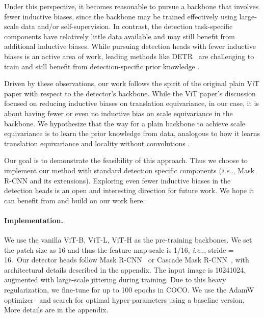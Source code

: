 \documentclass[runningheads]{llncs}
\makeatletter
\DeclareRobustCommand\onedot{\futurelet\@let@token\@onedot}
\def\@onedot{\ifx\@let@token.\else.\null\fi\xspace}
\def\ie{\emph{i.e}\onedot} \def\Ie{\emph{I.e}\onedot}
\makeatother
\begin{document}
Under this perspective, it becomes reasonable to pursue a backbone that involves fewer inductive biases, since the backbone may be trained effectively using large-scale data and/or self-supervision. In contrast, the detection task-specific components have relatively little data available and may still benefit from additional inductive biases. While pursuing detection heads with fewer inductive biases is an active area of work, leading methods like DETR~\cite{Carion2020} are challenging to train and still benefit from detection-specific prior knowledge \cite{Zhu2020}.

Driven by these observations, our work follows the spirit of the original plain ViT paper with respect to the detector's backbone. While the ViT paper's discussion \cite{Dosovitskiy2021} focused on reducing inductive biases on translation equivariance, in our case, it is about having fewer or even no inductive bias on scale equivariance in the backbone. We hypothesize that the way for a plain backbone to achieve scale equivariance is to learn the prior knowledge from data, analogous to how it learns translation equivariance and locality without convolutions \cite{Dosovitskiy2021}.

Our goal is to demonstrate the feasibility of this approach. Thus we choose to implement our method with standard detection specific components (\ie, Mask R-CNN and its extensions). Exploring even fewer inductive biases in the detection heads is an open and interesting direction for future work. We hope it can benefit from and build on our work here.

\paragraph{Implementation.} We use the vanilla ViT-B, ViT-L, ViT-H \cite{Dosovitskiy2021} as the pre-training backbones. We set the patch size as 16 and thus the feature map scale is 1/16, \ie, stride = 16.\footnotemark~Our detector heads follow Mask R-CNN~\cite{He2017} or Cascade Mask R-CNN~\cite{Cai2019}, with architectural details described in the appendix.
The input image is 10241024, augmented with large-scale jittering \cite{Ghiasi2021} during training.
Due to this heavy regularization, we fine-tune for up to 100 epochs in COCO.
We use the AdamW optimizer~\cite{Loshchilov2019} and search for optimal hyper-parameters using a baseline version. More details are in the appendix.

\end{document}
